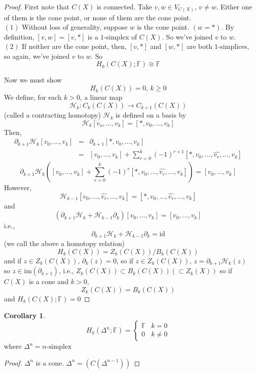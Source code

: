 \documentclass[a4paper,14pt]{extarticle}
\theoremstyle{definition}
\newtheorem*{corollary}{Corollary}
\begin{document}
\begin{proof}
	First note that $C(X)$ is connected. Take $v,w\in V_{C(X)}, \,v\neq w$. Either one of them is 
	the cone point, or none of them are the cone point. \\

	$(1)$ Without loss of generality,
	suppose $w$ is the cone point. $(w=*)$. By definition, $[v,w]=[v,*]$ is a $1$-simplex of
	$C(X)$. So we've joined $v$ to $w$. \\

	$(2)$ If neither are the cone point, then, $[v,*]$ and $[w,*]$ are both $1$-simplices, so again,
	we've joined $v$ to $w$. So \[H_0(C(X);\mathbb{F})\cong \mathbb{F}\]

	Now we must show \[H_k(C(X))=0, \,k\geq0\] We define, for each $k>0$, a linear map
	\[\mathcal{H}_k:C_k(C(X))\rightarrow C_{k+1}(C(X))\] (called a contracting homotopy)
	$\mathcal{H}_k$ is defined on a basis by \[\mathcal{H}_k[v_o,\ldots,v_k]=[*,v_0,\ldots,v_k]\]
	Then,
	\begin{eqnarray*}
		\partial_{k+1}\mathcal{H}_k[v_0,\ldots,v_k]&=&\partial_{k+1}[*,v_0,\ldots,v_k] \\
					&=&[v_0,\ldots,v_k]+\sum_{r=0}^k(-1)^{r+1}[*,v_0,\ldots,\hat{v_r},\ldots,v_k]
	\end{eqnarray*}
	\[\partial_{k+1}\mathcal{H}_k
	([v_0,\ldots,v_k]+\sum_{r=0}^k(-1)^r[*,v_0,\ldots,\hat{v_r},\ldots,v_k])
	=[v_0,\ldots,v_k]\] However,
	\[\mathcal{H}_{k-1}[v_0,\ldots,\hat{v_r},\ldots,v_k]=[*,v_0,\ldots,\hat{v_r},\ldots,v_k]\]
	and
	\[(\partial_{k+1}\mathcal{H}_k+\mathcal{H}_{k-1}\partial_{k})[v_0,\ldots,v_k]=
	[v_0,\ldots,v_k]\] i.e.,
	\[\partial_{k+1}\mathcal{H}_k + \mathcal{H}_{k-1}\partial_{k}=\text{id}\]
	(we call the above a homotopy relation)
	\[H_k(C(X))=Z_k(C(X))/B_k(C(X))\] and if $z\in Z_k(C(X)),\,\partial_k(z)=0$, so 
	if $z\in Z_k(C(X)), \,z=\partial_{k+1}\mathcal{H}_k(z)$ so $z\in\text{im}(\partial_{k+1})$,
	i.e., $Z_k(C(X))\subset B_k(C(X)) (\subset Z_k(X))$ so if $C(X)$ is a cone and $k>0$,
	\[Z_k(C(X))=B_k(C(X))\] and $H_k(C(X);\mathbb{F})=0$
\end{proof}

\begin{corollary}
	\[H_k(\Delta^n;\mathbb{F})=\begin{cases}\mathbb{F}&k=0\\0&k\neq0\end{cases}\]
	where $\Delta^n=\text{$n$-simplex}$
\end{corollary}

\begin{proof}
	$\Delta^n$ is a cone. $\Delta^n=(C(\Delta^{n-1}))$
\end{proof}
\end{document}
